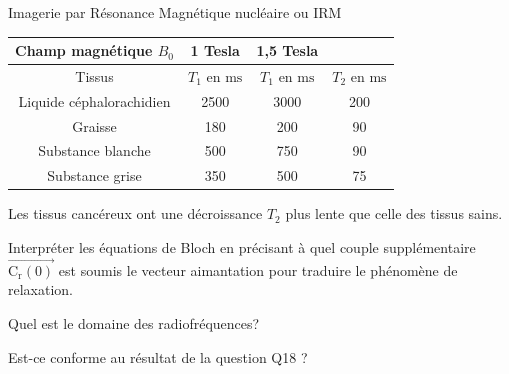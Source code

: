 \begin{exo}[PC][1][devoir]{Imagerie par Résonance Magnétique nucléaire ou IRM}
\begin{center}
	\begin{tabular}{|c|c|c|c|}
		\hline
		Champ magnétique $B_0$ & 1 Tesla & 1,5 Tesla &  \\
		\hline
		Tissus & ${T}_{1}$ en $\mathrm{ms}$ & ${T}_{1}$ en $\mathrm{ms}$ & ${T}_{2}$ en $\mathrm{ms}$ \\
		\hline
		Liquide céphalorachidien & 2500 & 3000 & 200 \\
		\hline
		Graisse & 180 & 200 & 90 \\
		\hline
		Substance blanche & 500 & 750 & 90 \\
		\hline
		Substance grise & 350 & 500 & 75 \\
		\hline
	\end{tabular}
\end{center}

Les tissus cancéreux ont une décroissance $T_{2}$ plus lente que celle des tissus sains.

\begin{quest}
	\item Interpréter les équations de Bloch en précisant à quel couple supplémentaire $\overrightarrow{\mathrm{C}_{\mathrm{r}}(0)}$ est soumis le vecteur aimantation pour traduire le phénomène de relaxation.

	\item Quel est le domaine des radiofréquences?

	Est-ce conforme au résultat de la question Q18 ?

\end{quest}

\end{exo}
